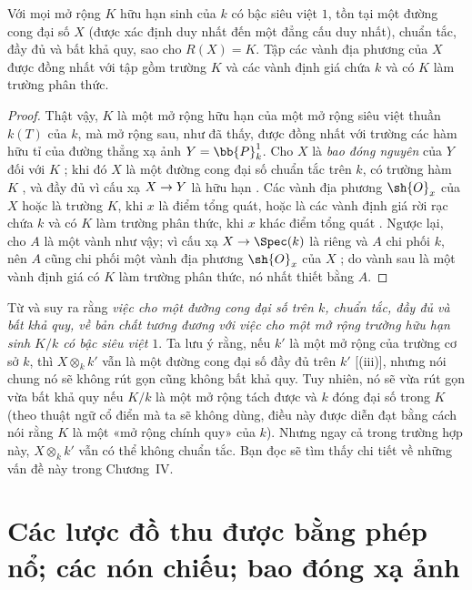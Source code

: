 \documentclass[oneside,10pt]{amsart}
\makeatletter
\newcommand{\ega@arrow}[2]{\mathchoice{#1}{#2}{#2}{#2}}
\renewcommand{\to}{\ega@arrow{\longrightarrow}{\rightarrow}}
\let\EGAOriginalLabel\label
\renewcommand{\label}[1]{\phantomsection\EGAOriginalLabel{#1}}
\makeatother
\begin{document}
\begin{proposition}[7.4.18]
\label{II.7.4.18}
Với mọi mở rộng $K$ hữu hạn sinh của $k$ có bậc siêu việt $1$, tồn tại một đường cong đại số $X$ (được xác định duy nhất đến một đẳng cấu duy nhất), chuẩn tắc, đầy đủ và bất khả quy, sao cho $R(X)=K$.
Tập các vành địa phương của $X$ được đồng nhất  với tập gồm trường $K$ và các vành định giá chứa $k$ và có $K$ làm trường phân thức.
\end{proposition}

\begin{proof}
Thật vậy, $K$ là một mở rộng hữu hạn của một mở rộng siêu việt thuần $k(T)$ của $k$, mà mở rộng sau, như đã thấy, được đồng nhất với trường các hàm hữu tỉ của đường thẳng xạ ảnh $Y=\bb{P}_k^1$.
Cho $X$ là \emph{bao đóng nguyên} của $Y$ đối với $K$ ;
khi đó $X$ là một đường cong đại số chuẩn tắc trên $k$, có trường hàm $K$ , và đầy đủ vì cấu xạ $X\to Y$ là hữu hạn .
Các vành địa phương $\sh{O}_x$ của $X$ hoặc là trường $K$, khi $x$ là điểm tổng quát, hoặc là các vành định giá rời rạc chứa $k$ và có $K$ làm trường phân thức, khi $x$ khác điểm tổng quát .
Ngược lại, cho $A$ là một vành như vậy;
vì cấu xạ $X\to\Spec(k)$ là riêng và $A$ chi phối $k$, nên $A$ cũng chi phối một vành địa phương $\sh{O}_x$ của $X$ ;
do vành sau là một vành định giá có $K$ làm trường phân thức, nó nhất thiết bằng $A$.
\end{proof}

\begin{remarks}[7.4.19]
\label{II.7.4.19}
Từ  và  suy ra rằng \emph{việc cho một đường cong đại số trên $k$, chuẩn tắc, đầy đủ và bất khả quy, về bản chất tương đương với việc cho một mở rộng trường hữu hạn sinh $K/k$ có bậc siêu việt $1$}.
Ta lưu ý rằng, nếu $k'$ là một mở rộng của trường cơ sở $k$, thì $X\otimes_k k'$ vẫn là một đường cong đại số đầy đủ trên $k'$ [(iii)], nhưng nói chung nó sẽ không rút gọn cũng không bất khả quy.
Tuy nhiên, nó sẽ vừa rút gọn vừa bất khả quy nếu $K/k$ là một mở rộng tách được và $k$ đóng đại số trong $K$ (theo thuật ngữ cổ điển mà ta sẽ không dùng, điều này được diễn đạt bằng cách nói rằng $K$ là một «mở rộng chính quy» của $k$).
Nhưng ngay cả trong trường hợp này, $X\otimes_k k'$ vẫn có thể không chuẩn tắc.
Bạn đọc sẽ tìm thấy chi tiết về những vấn đề này trong Chương~IV.
\end{remarks}

\section{Các lược đồ thu được bằng phép nổ; các nón chiếu; bao đóng xạ ảnh}
\label{section:II.8}
\end{document}

